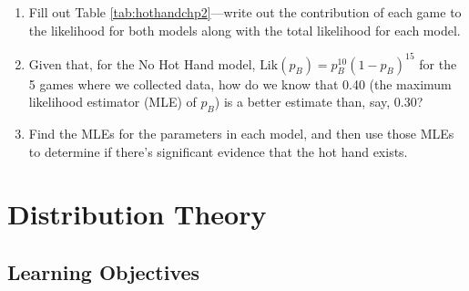 \documentclass[
]{krantz}
\begin{document}
\begin{enumerate}
  \begin{enumerate}
  \def\labelenumii{\alph{enumii}.}
  \item
    Fill out Table \ref{tab:hothandchp2}---write out the contribution of each game to the likelihood for both models along with the total likelihood for each model.
  \item
    Given that, for the No Hot Hand model, \(\textrm{Lik}(p_B)=p_B^{10}(1-p_B)^{15}\) for the 5 games where we collected data, how do we know that 0.40 (the maximum likelihood estimator (MLE) of \(p_B\)) is a better estimate than, say, 0.30?
  \item
    Find the MLEs for the parameters in each model, and then use those MLEs to determine if there's significant evidence that the hot hand exists.
  \end{enumerate}
\end{enumerate}

\begin{table}

\caption{\label{tab:hothandchp2}Data for Open Exercise 2.  B = made basket.  M = missed basket.}
\centering
{}
\end{table}

\hypertarget{ch-distthry}{%
\chapter{Distribution Theory}\label{ch-distthry}}

\hypertarget{learning-objectives-2}{%
\section{Learning Objectives}\label{learning-objectives-2}}
\end{document}
